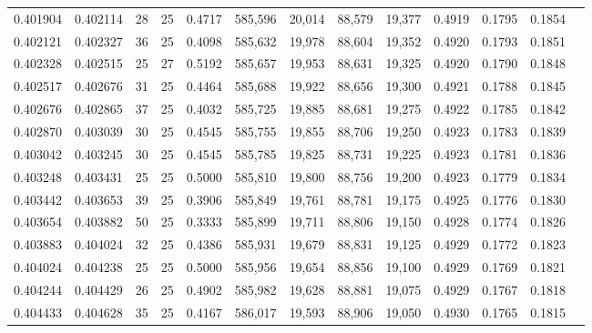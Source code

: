 \begin{tabular}{rrrrrrrrrrrrr}
0.401904 & 0.402114 &    28 &  25 &                                     0.4717 & 585,596 &  20,014 &  88,579 &  19,377 & 0.4919 & 0.1795 & 0.1854 \\
0.402121 & 0.402327 &    36 &  25 &                                     0.4098 & 585,632 &  19,978 &  88,604 &  19,352 & 0.4920 & 0.1793 & 0.1851 \\
0.402328 & 0.402515 &    25 &  27 &                                     0.5192 & 585,657 &  19,953 &  88,631 &  19,325 & 0.4920 & 0.1790 & 0.1848 \\
0.402517 & 0.402676 &    31 &  25 &                                     0.4464 & 585,688 &  19,922 &  88,656 &  19,300 & 0.4921 & 0.1788 & 0.1845 \\
0.402676 & 0.402865 &    37 &  25 &                                     0.4032 & 585,725 &  19,885 &  88,681 &  19,275 & 0.4922 & 0.1785 & 0.1842 \\
0.402870 & 0.403039 &    30 &  25 &                                     0.4545 & 585,755 &  19,855 &  88,706 &  19,250 & 0.4923 & 0.1783 & 0.1839 \\
0.403042 & 0.403245 &    30 &  25 &                                     0.4545 & 585,785 &  19,825 &  88,731 &  19,225 & 0.4923 & 0.1781 & 0.1836 \\
0.403248 & 0.403431 &    25 &  25 &                                     0.5000 & 585,810 &  19,800 &  88,756 &  19,200 & 0.4923 & 0.1779 & 0.1834 \\
0.403442 & 0.403653 &    39 &  25 &                                     0.3906 & 585,849 &  19,761 &  88,781 &  19,175 & 0.4925 & 0.1776 & 0.1830 \\
0.403654 & 0.403882 &    50 &  25 &                                     0.3333 & 585,899 &  19,711 &  88,806 &  19,150 & 0.4928 & 0.1774 & 0.1826 \\
0.403883 & 0.404024 &    32 &  25 &                                     0.4386 & 585,931 &  19,679 &  88,831 &  19,125 & 0.4929 & 0.1772 & 0.1823 \\
0.404024 & 0.404238 &    25 &  25 &                                     0.5000 & 585,956 &  19,654 &  88,856 &  19,100 & 0.4929 & 0.1769 & 0.1821 \\
0.404244 & 0.404429 &    26 &  25 &                                     0.4902 & 585,982 &  19,628 &  88,881 &  19,075 & 0.4929 & 0.1767 & 0.1818 \\
0.404433 & 0.404628 &    35 &  25 &                                     0.4167 & 586,017 &  19,593 &  88,906 &  19,050 & 0.4930 & 0.1765 & 0.1815 \\

\end{tabular}
